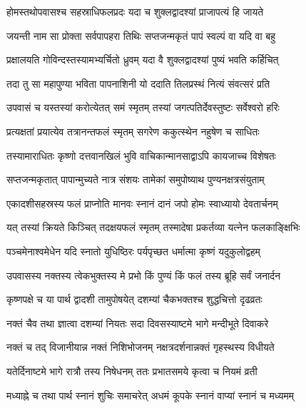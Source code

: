 \twolineshloka
{होमस्तथोपवासश्च सहस्राधिफलप्रदः}
{यदा च शुक्लद्वादश्यां प्राजापत्यं हि जायते}%

\twolineshloka
{जयन्ती नाम सा प्रोक्ता सर्वपापहरा तिथिः}
{सप्तजन्मकृतं पापं स्वल्पं वा यदि वा बहु}%

\twolineshloka
{प्रक्षालयति गोविन्दस्तस्यामभ्यर्चितो ध्रुवम्}
{यदा वै शुक्लद्वादश्यां पुष्यं भवति कर्हिचित्}%

\twolineshloka
{तदा तु सा महापुण्या भविता पापनाशिनी}
{यो ददाति तिलप्रस्थं नित्यं संवत्सरं प्रति}%

\twolineshloka
{उपवासं च यस्तस्यां करोत्येतत् समं स्मृतम्}
{तस्यां जगत्पतिर्देवस्तुष्टः सर्वेश्वरो हरिः}%

\twolineshloka
{प्रत्यक्षतां प्रयात्येव तत्रानन्तफलं स्मृतम्}
{सगरेण ककुत्स्थेन नहुषेण च साधितः}%

\twolineshloka
{तस्यामाराधितः कृष्णो दत्तवानखिलं भुवि}
{वाचिकान्मानसाद्वाऽपि कायजाच्च विशेषतः}%

\twolineshloka
{सप्तजन्मकृतात् पापान्मुच्यते नात्र संशयः}
{तामेकां समुपोष्याथ पुण्यनक्षत्रसंयुताम्}%

\twolineshloka
{एकादशीसहस्रस्य फलं प्राप्नोति मानवः}
{स्नानं दानं जपो होमः स्वाध्यायो देवतार्चनम्}%

\twolineshloka
{यत् तस्यां क्रियते किञ्चित् तदक्षयफलं स्मृतम्}
{तस्मादेषा प्रकर्तव्या यत्नेन फलकाङ्क्षिभिः}%

\twolineshloka
{पञ्चमेनाश्वमेधेन यदि स्नातो युधिष्ठिरः}
{पर्यपृच्छत धर्मात्मा कृष्णं यदुकुलोद्वहम्}%


\twolineshloka
{उपवासस्य नक्तस्य त्वेकभुक्तस्य मे प्रभो}
{किं पुण्यं किं फलं तस्य ब्रूहि सर्वं जनार्दन}%


\twolineshloka
{कृष्णपक्षे च या पार्थ द्वादशी तामुपोषयेत्}
{दशम्यां चैकभक्तश्च शुद्धचित्तो दृढव्रतः}%

\twolineshloka
{नक्तं चैव तथा ज्ञात्वा दशम्यां नियतः सदा}
{दिवसस्याष्टमे भागे मन्दीभूते दिवाकरे}%

\twolineshloka
{नक्तं च तद् विजानीयान्न नक्तं निशिभोजनम्}
{नक्षत्रदर्शनान्नक्तं गृहस्थस्य विधीयते}%

\twolineshloka
{यतेर्दिनाष्टमे भागे रात्रौ तस्य निषेधनम्}
{ततः प्रभातसमये कृत्वा च नियमं व्रती}%

\twolineshloka
{मध्याह्ने च तथा पार्थ स्नानं शुचिः समाचरेत्}
{अधमं कूपके स्नानं वाप्यां स्नानं च मध्यमम्}%

